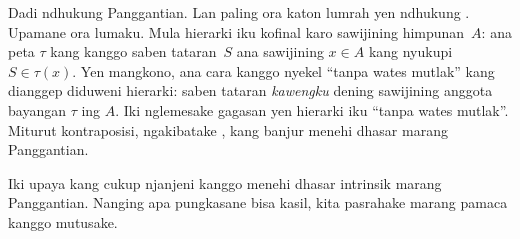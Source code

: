 \documentclass[../../../include/open-logic-section]{subfiles}
\begin{document}
Dadi \stagescofin{} ndhukung Panggantian.
Lan paling ora katon lumrah yen \stagesinex{}
ndhukung \stagescofin. Upamane \stagescofin{}
ora lumaku. Mula hierarki iku kofinal karo
sawijining himpunan~$A$: ana peta $\tau$
kang kanggo saben tataran~$S$ ana sawijining
$x \in A$ kang nyukupi $S \in \tau(x)$.
Yen mangkono, ana cara kanggo nyekel
``tanpa wates mutlak'' kang dianggep diduweni
hierarki: saben tataran \emph{kawengku} dening
sawijining anggota bayangan $\tau$ ing $A$.
Iki nglemesake gagasan
yen hierarki iku ``tanpa wates mutlak''.
Miturut kontraposisi, \stagesinex{}
ngakibatake \stagescofin, kang banjur menehi
dhasar marang Panggantian.

Iki upaya kang cukup njanjeni kanggo menehi
dhasar intrinsik marang Panggantian. Nanging
apa pungkasane bisa kasil, kita pasrahake
marang pamaca kanggo mutusake.
\end{document}
